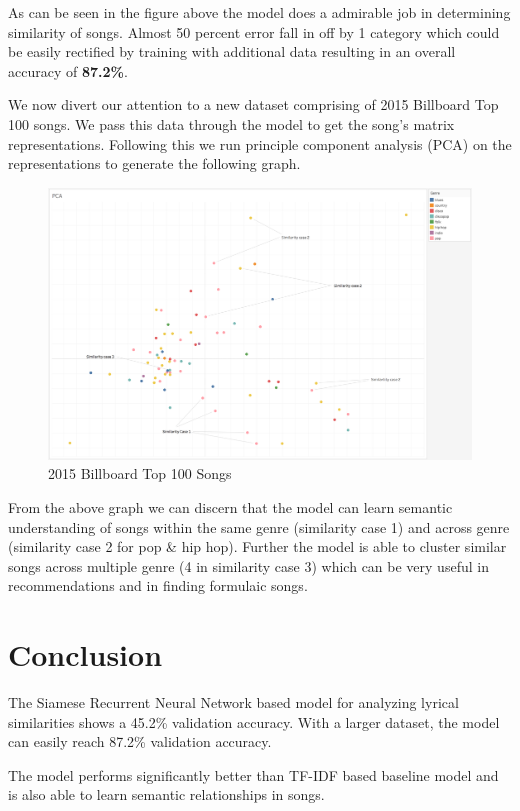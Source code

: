 \documentclass[11pt]{article}
\begin{document}
As can be seen in the figure above the model does a admirable job in 
determining similarity of songs. Almost 50 percent error fall in off
by 1 category which could be easily rectified by training with additional
data resulting in an overall accuracy of \textbf{87.2\%}.

We now divert our attention to a new dataset comprising of 2015 Billboard
Top 100 songs. We pass this data through the model to get the song's
matrix representations. Following this we run principle component analysis
(PCA) on the representations to generate the following graph.
\begin{figure}
  \includegraphics[width=\linewidth]{pca.png}
  \caption{2015 Billboard Top 100 Songs}
  \label{fig:pca}
\end{figure}
From the above graph we can discern that the model can learn semantic
understanding of songs within the same genre (similarity case 1) and 
across genre (similarity case 2 for pop \& hip hop). Further the model is 
able to cluster similar songs across multiple genre (4 in similarity case 3)
which can be very useful in recommendations and in finding formulaic songs.

\section{Conclusion}
The Siamese Recurrent Neural Network based model for analyzing lyrical
similarities shows a 45.2\% validation accuracy. With a larger dataset,
the model can easily reach 87.2\% validation accuracy.

The model performs significantly better than TF-IDF based baseline model
and is also able to learn semantic relationships in songs.
\end{document}

